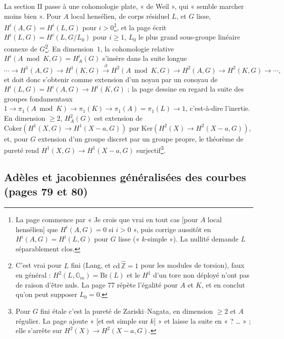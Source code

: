 \documentclass[11pt,a4paper]{article}
\begin{document}
La section II passe à une cohomologie plate, « de Weil », qui « semble marcher
moins bien ». Pour $A$ local hensélien, de corps résiduel $L$, et $G$ lisse,
$H^i(A, G) = H^i(L, G)$ pour $i > 0$\footnote{La page commence par « Je crois que
vrai en tout cas [pour $A$ local hensélien] que $H^i(A, G) = 0$ si $i > 0$ », puis
corrige aussitôt en $H^i(A, G) = H^i(L, G)$ pour $G$ lisse (« $k$-simple »). La
nullité demande $L$ séparablement clos.}, et la page écrit $H^i(L, G) = H^i(L,
G/L_0)$ pour $i \geq 1$, $L_0$ le plus grand sous-groupe linéaire connexe de
$G$\footnote{C'est vrai pour $L$ fini (Lang, et $\mathrm{cd}\,\hat{\mathbb{Z}} = 1$
pour les modules de torsion), faux en général : $H^2(L, \mathbb{G}_m) =
\mathrm{Br}(L)$ et le $H^1$ d'un tore non déployé n'ont pas de raison d'être nuls.
La page 77 répète l'égalité pour $A$ et $K$, et en conclut qu'on peut supposer
$L_0 = 0$.}. En dimension~$1$, la cohomologie relative $H^i(A \bmod K, G) =
H^i_A(G)$ s'insère dans la suite longue
\[
\cdots \to H^1(A, G) \to H^1(K, G) \xrightarrow{\ \partial\ } H^2(A \bmod K, G) \to
H^2(A, G) \to H^2(K, G) \to \cdots,
\]
et doit donc s'obtenir comme extension d'un noyau par un conoyau de $H^i(L, G) =
H^i(A, G) \to H^i(K, G)$ ; la page dessine en regard la suite des groupes
fondamentaux $1 \to \pi_1(A \bmod K) \to \pi_1(K) \to \pi_1(A) = \pi_1(L) \to 1$,
c'est-à-dire l'inertie. En dimension $\geq 2$, $H^2_A(G)$ est extension de
$\mathrm{Coker}(H^1(X, G) \to H^1(X - a, G))$ par $\mathrm{Ker}(H^2(X) \to H^2(X - a,
G))$, et, pour $G$ extension d'un groupe discret par un groupe propre, le
théorème de pureté rend $H^1(X, G) \to H^1(X - a, G)$ surjectif\footnote{Pour $G$
fini étale c'est la pureté de Zariski–Nagata, en dimension $\geq 2$ et $A$
régulier. La page ajoute « [et est simple sur $k$] » et laisse la suite en
« ? … » ; elle s'arrête sur $H^2(X) \to H^2(X - a, G)$.}.

\subsection*{Adèles et jacobiennes généralisées des courbes (pages 79 et 80)}
\end{document}
